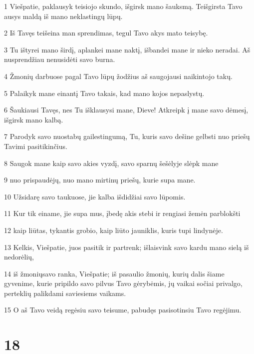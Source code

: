 \par 1 Viešpatie, paklausyk teisiojo skundo, išgirsk mano šauksmą. Teišgirsta Tavo ausys maldą iš mano neklastingų lūpų. 
\par 2 Iš Tavęs teišeina man sprendimas, tegul Tavo akys mato teisybę. 
\par 3 Tu ištyrei mano širdį, aplankei mane naktį, išbandei mane ir nieko neradai. Aš nusprendžiau nenusidėti savo burna. 
\par 4 Žmonių darbuose pagal Tavo lūpų žodžius aš saugojausi naikintojo takų. 
\par 5 Palaikyk mane einantį Tavo takais, kad mano kojos nepaslystų. 
\par 6 Šaukiausi Tavęs, nes Tu išklausysi mane, Dieve! Atkreipk į mane savo dėmesį, išgirsk mano kalbą. 
\par 7 Parodyk savo nuostabų gailestingumą, Tu, kuris savo dešine gelbsti nuo priešų Tavimi pasitikinčius. 
\par 8 Saugok mane kaip savo akies vyzdį, savo sparnų šešėlyje slėpk mane 
\par 9 nuo prispaudėjų, nuo mano mirtinų priešų, kurie supa mane. 
\par 10 Užsidarę savo taukuose, jie kalba išdidžiai savo lūpomis. 
\par 11 Kur tik einame, jie supa mus, įbedę akis stebi ir rengiasi žemėn parblokšti 
\par 12 kaip liūtas, tykantis grobio, kaip liūto jauniklis, kuris tupi lindynėje. 
\par 13 Kelkis, Viešpatie, juos pasitik ir partrenk; išlaisvink savo kardu mano sielą iš nedorėlių, 
\par 14 iš žmonių­savo ranka, Viešpatie; iš pasaulio žmonių, kurių dalis šiame gyvenime, kurie pripildo savo pilvus Tavo gėrybėmis, jų vaikai sočiai privalgo, perteklių palikdami saviesiems vaikams. 
\par 15 O aš Tavo veidą regėsiu savo teisume, pabudęs pasisotinsiu Tavo regėjimu.



\chapter{18}

